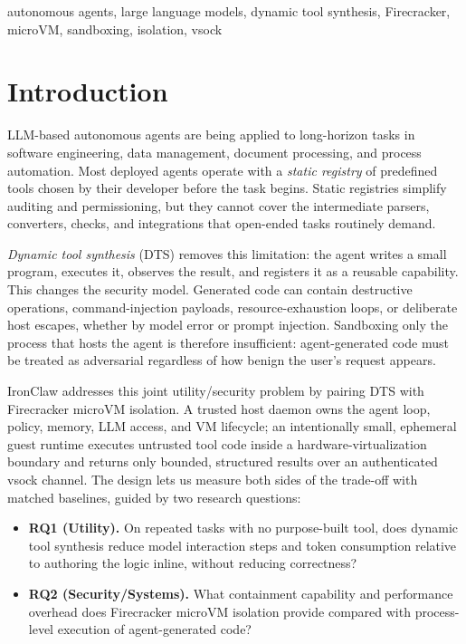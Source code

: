 \documentclass[conference]{IEEEtran}
\newcommand{\toolname}{IronClaw}
\begin{document}
\begin{IEEEkeywords}
autonomous agents, large language models, dynamic tool synthesis, Firecracker,
microVM, sandboxing, isolation, vsock
\end{IEEEkeywords}

\section{Introduction}
LLM-based autonomous agents are being applied to long-horizon tasks in software
engineering, data management, document processing, and process automation.
Most deployed agents operate with a \emph{static registry} of predefined tools
chosen by their developer before the task begins. Static registries simplify
auditing and permissioning, but they cannot cover the intermediate parsers,
converters, checks, and integrations that open-ended tasks routinely demand.

\emph{Dynamic tool synthesis} (DTS) removes this limitation: the agent writes a
small program, executes it, observes the result, and registers it as a reusable
capability. This changes the security model. Generated code can contain
destructive operations, command-injection payloads, resource-exhaustion loops,
or deliberate host escapes, whether by model error or prompt injection.
Sandboxing only the process that hosts the agent is therefore insufficient:
agent-generated code must be treated as adversarial regardless of how benign
the user's request appears.

\toolname{} addresses this joint utility/security problem by pairing DTS with
Firecracker microVM isolation. A trusted host daemon owns the agent loop,
policy, memory, LLM access, and VM lifecycle; an intentionally small,
ephemeral guest runtime executes untrusted tool code inside a
hardware-virtualization boundary and returns only bounded, structured results
over an authenticated vsock channel. The design lets us measure both sides of
the trade-off with matched baselines, guided by two research questions:

\begin{itemize}
\item \textbf{RQ1 (Utility).} On repeated tasks with no purpose-built tool,
does dynamic tool synthesis reduce model interaction steps and token
consumption relative to authoring the logic inline, without reducing
correctness?
\item \textbf{RQ2 (Security/Systems).} What containment capability and
performance overhead does Firecracker microVM isolation provide compared with
process-level execution of agent-generated code?
\end{itemize}
\end{document}
